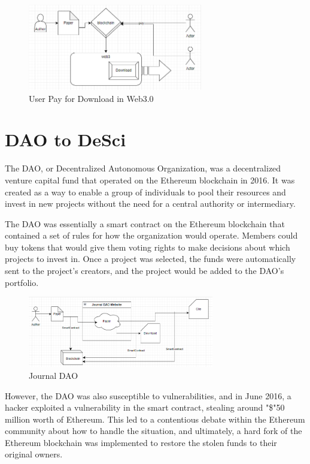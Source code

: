 \documentclass[lettersize,journal]{IEEEtran}
\begin{document}
\begin{figure}[h]
  \centering
  \includegraphics[width=3in]{assets/web3.png}
  \caption{User Pay for Download in Web3.0}
\end{figure}
  

\section{DAO to DeSci}


The DAO, or Decentralized Autonomous Organization, was a decentralized venture capital fund that operated on the Ethereum blockchain in 2016. It was created as a way to enable a group of individuals to pool their resources and invest in new projects without the need for a central authority or intermediary.

The DAO was essentially a smart contract on the Ethereum blockchain that contained a set of rules for how the organization would operate. Members could buy tokens that would give them voting rights to make decisions about which projects to invest in. Once a project was selected, the funds were automatically sent to the project's creators, and the project would be added to the DAO's portfolio.


\begin{figure}[h]
  \centering
  \includegraphics[width=3.2in]{assets/jdao.png}
  \caption{Journal DAO}
\end{figure}

However, the DAO was also susceptible to vulnerabilities, and in June 2016, a hacker exploited a vulnerability in the smart contract, stealing around "\$"50 million worth of Ethereum. This led to a contentious debate within the Ethereum community about how to handle the situation, and ultimately, a hard fork of the Ethereum blockchain was implemented to restore the stolen funds to their original owners.
\end{document}

